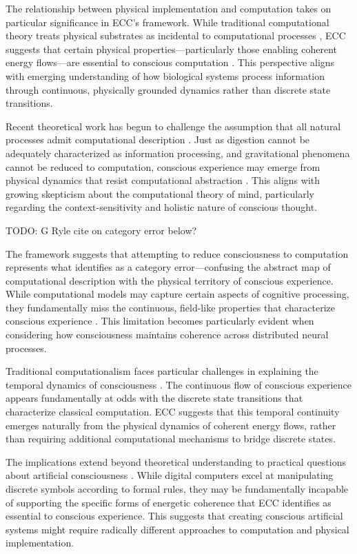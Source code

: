 The relationship between physical implementation and computation takes on particular significance in ECC's framework. While traditional computational theory treats physical substrates as incidental to computational processes \cite{Chalmers2011}, ECC suggests that certain physical properties—particularly those enabling coherent energy flows—are essential to conscious computation \cite{Landauer1996}. This perspective aligns with emerging understanding of how biological systems process information through continuous, physically grounded dynamics rather than discrete state transitions.

Recent theoretical work has begun to challenge the assumption that all natural processes admit computational description \cite{Searle1990}. Just as digestion cannot be adequately characterized as information processing, and gravitational phenomena cannot be reduced to computation, conscious experience may emerge from physical dynamics that resist computational abstraction \cite{vanGelder1995}. This aligns with growing skepticism about the computational theory of mind, particularly regarding the context-sensitivity and holistic nature of conscious thought.

TODO: G Ryle cite on category error below?

The framework suggests that attempting to reduce consciousness to computation represents what \cite{Smith2002} identifies as a category error—confusing the abstract map of computational description with the physical territory of conscious experience. While computational models may capture certain aspects of cognitive processing, they fundamentally miss the continuous, field-like properties that characterize conscious experience \cite{Piccinini2015}. This limitation becomes particularly evident when considering how consciousness maintains coherence across distributed neural processes.

Traditional computationalism faces particular challenges in explaining the temporal dynamics of consciousness \cite{Siegelmann2003}. The continuous flow of conscious experience appears fundamentally at odds with the discrete state transitions that characterize classical computation. ECC suggests that this temporal continuity emerges naturally from the physical dynamics of coherent energy flows, rather than requiring additional computational mechanisms to bridge discrete states.

The implications extend beyond theoretical understanding to practical questions about artificial consciousness \cite{Aaronson2013}. While digital computers excel at manipulating discrete symbols according to formal rules, they may be fundamentally incapable of supporting the specific forms of energetic coherence that ECC identifies as essential to conscious experience. This suggests that creating conscious artificial systems might require radically different approaches to computation and physical implementation.

